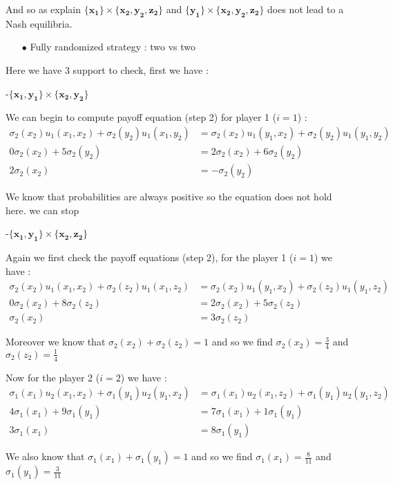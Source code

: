 And so as explain $\mathbf{\{x_1\}}\times\mathbf{\{x_2,y_2,z_2\}}$ and $\mathbf{\{y_1\}}\times\mathbf{\{x_2,y_2,z_2\}}$ does not lead to a Nash equilibria.


\begin{itemize}
  \item[$\bullet$] Fully randomized strategy : two vs two
\end{itemize}

Here we have 3 support to check, first we have :

-$\mathbf{\{x_1,y_1\}}\times\mathbf{\{x_2,y_2\}}$

 We can begin to compute payoff equation (step 2) for player 1 ($i=1$) :
 \begin{align*}
 \sigma_2(x_2)u_1(x_1,x_2) + \sigma_2(y_2)u_1(x_1,y_2) &= \sigma_2(x_2)u_1(y_1,x_2) + \sigma_2(y_2)u_1(y_1,y_2) \\
 0\sigma_2(x_2)+5\sigma_2(y_2)&= 2\sigma_2(x_2) + 6\sigma_2(y_2) \\
 2\sigma_2(x_2)&=-\sigma_2(y_2)
\end{align*}

We know that  probabilities are  always positive so the equation does not hold here. we can stop


-$\mathbf{\{x_1,y_1\}}\times\mathbf{\{x_2,z_2\}}$

Again we first check the payoff equations (step 2), for the player 1 ($i=1$) we have : 
\begin{align*}
 \sigma_2(x_2)u_1(x_1,x_2) + \sigma_2(z_2)u_1(x_1,z_2) &= \sigma_2(x_2)u_1(y_1,x_2) + \sigma_2(z_2)u_1(y_1,z_2) \\
 0\sigma_2(x_2)+8\sigma_2(z_2)&= 2\sigma_2(x_2) + 5\sigma_2(z_2) \\
 \sigma_2(x_2)&=3\sigma_2(z_2)
\end{align*}

Moreover we know that $\sigma_2(x_2) + \sigma_2(z_2) = 1$ and so we find $\sigma_2(x_2)=\frac{3}{4}$ and $\sigma_2(z_2)=\frac{1}{4}$

Now for the player 2 ($i=2$) we have : 
\begin{align*}
 \sigma_1(x_1)u_2(x_1,x_2) + \sigma_1(y_1)u_2(y_1,x_2) &= \sigma_1(x_1)u_2(x_1,z_2) + \sigma_1(y_1)u_2(y_1,z_2) \\
 4\sigma_1(x_1)+9\sigma_1(y_1)&= 7\sigma_1(x_1) + 1\sigma_1(y_1) \\
 3\sigma_1(x_1)&=8\sigma_1(y_1)
\end{align*}

We also know that $\sigma_1(x_1) + \sigma_1(y_1) = 1$ and so we find $\sigma_1(x_1)=\frac{8}{11}$ and $\sigma_1(y_1)=\frac{3}{11}$

